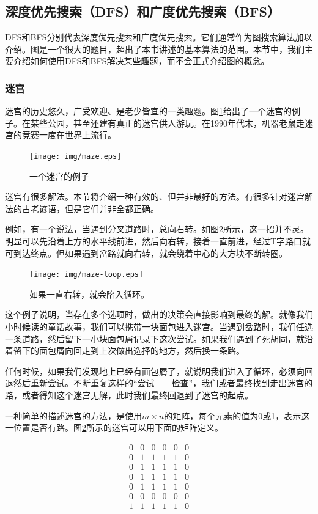 \documentclass[UTF8]{article}
\begin{document}
\subsection{深度优先搜索（DFS）和广度优先搜索（BFS）}
 
DFS和BFS分别代表深度优先搜索和广度优先搜索。它们通常作为图搜索算法加以介绍。图是一个很大的题目，超出了本书讲述的基本算法的范围。本节中，我们主要介绍如何使用DFS和BFS解决某些趣题，而不会正式介绍图的概念。

\subsubsection{迷宫}
迷宫的历史悠久，广受欢迎、是老少皆宜的一类趣题。图\ref{fig:maze}给出了一个迷宫的例子。在某些公园，甚至还建有真正的迷宫供人游玩。在1990年代末，机器老鼠走迷宫的竞赛一度在世界上流行。

\begin{figure}[htbp]
 \centering
 \texttt{[image: img/maze.eps]}
 \caption{一个迷宫的例子}
 \label{fig:maze}
\end{figure}

迷宫有很多解法。本节将介绍一种有效的、但并非最好的方法。有很多针对迷宫解法的古老谚语，但是它们并非全都正确。

例如，有一个说法，当遇到分叉道路时，总向右转。如图\ref{fig:maze-loop}所示，这一招并不灵。明显可以先沿着上方的水平线前进，然后向右转，接着一直前进，经过T字路口就可到达终点。但如果遇到岔路就向右转，就会绕着中心的大方块不断转圈。

\begin{figure}[htbp]
 \centering
 \texttt{[image: img/maze-loop.eps]}
 \caption{如果一直右转，就会陷入循环。}
 \label{fig:maze-loop}
\end{figure}

这个例子说明，当存在多个选项时，做出的决策会直接影响到最终的解。就像我们小时候读的童话故事，我们可以携带一块面包进入迷宫。当遇到岔路时，我们任选一条道路，然后留下一小块面包屑记录下这次尝试。如果我们遇到了死胡同，就沿着留下的面包屑向回走到上次做出选择的地方，然后换一条路。

任何时候，如果我们发现地上已经有面包屑了，就说明我们进入了循环，必须向回退然后重新尝试。不断重复这样的“尝试——检查”，我们或者最终找到走出迷宫的路，或者得知这个迷宫无解，此时我们最终回退到了迷宫的起点。

一种简单的描述迷宫的方法，是使用$m \times n$的矩阵，每个元素的值为0或1，表示这一位置是否有路。图\ref{fig:maze-loop}所示的迷宫可以用下面的矩阵定义。

\[
\begin{matrix}
0 & 0 & 0 & 0 & 0 & 0 \\
0 & 1 & 1 & 1 & 1 & 0 \\
0 & 1 & 1 & 1 & 1 & 0 \\
0 & 1 & 1 & 1 & 1 & 0 \\
0 & 1 & 1 & 1 & 1 & 0 \\
0 & 0 & 0 & 0 & 0 & 0 \\
1 & 1 & 1 & 1 & 1 & 0
\end{matrix}
\]
\end{document}
